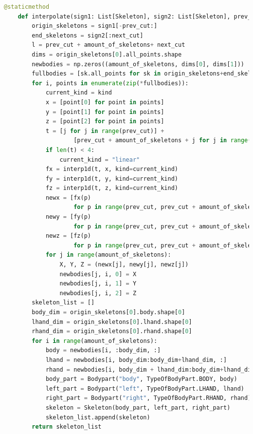\begin{lstlisting}[basicstyle=\tiny,language=Python, caption={Método estático interpolate de la clase TokenLSC}, label={code:tokenlsc:interpolate}] 
 @staticmethod
    def interpolate(sign1: List[Skeleton], sign2: List[Skeleton], prev_cut=2, next_cut=2, amount_of_skeletons=4, kind='cubic'):
        origin_skeletons = sign1[-prev_cut:]
        end_skeletons = sign2[:next_cut]
        l = prev_cut + amount_of_skeletons+ next_cut 
        dims = origin_skeletons[0].all_points.shape
        newbodies = np.zeros((amount_of_skeletons, dims[0], dims[1]))
        fullbodies = [sk.all_points for sk in origin_skeletons+end_skeletons]
        for i, points in enumerate(zip(*fullbodies)):
            current_kind = kind
            x = [point[0] for point in points]
            y = [point[1] for point in points]
            z = [point[2] for point in points]
            t = [j for j in range(prev_cut)] + 
            		[prev_cut + amount_of_skeletons + j for j in range(next_cut)]
            if len(t) < 4:
                current_kind = "linear"
            fx = interp1d(t, x, kind=current_kind)
            fy = interp1d(t, y, kind=current_kind)
            fz = interp1d(t, z, kind=current_kind)
            newx = [fx(p)
                    for p in range(prev_cut, prev_cut + amount_of_skeletons)]
            newy = [fy(p)
                    for p in range(prev_cut, prev_cut + amount_of_skeletons)]
            newz = [fz(p)
                    for p in range(prev_cut, prev_cut + amount_of_skeletons)]
            for j in range(amount_of_skeletons):
                X, Y, Z = (newx[j], newy[j], newz[j])
                newbodies[j, i, 0] = X
                newbodies[j, i, 1] = Y
                newbodies[j, i, 2] = Z
        skeleton_list = []
        body_dim = origin_skeletons[0].body.shape[0]
        lhand_dim = origin_skeletons[0].lhand.shape[0]
        rhand_dim = origin_skeletons[0].rhand.shape[0]
        for i in range(amount_of_skeletons):
            body = newbodies[i, :body_dim, :]
            lhand = newbodies[i, body_dim:body_dim+lhand_dim, :]
            rhand = newbodies[i, body_dim + lhand_dim:body_dim+lhand_dim+rhand_dim, :]
            body_part = Bodypart("body", TypeOfBodyPart.BODY, body)
            left_part = Bodypart("left", TypeOfBodyPart.LHAND, lhand)
            right_part = Bodypart("right", TypeOfBodyPart.RHAND, rhand)
            skeleton = Skeleton(body_part, left_part, right_part)
            skeleton_list.append(skeleton)
        return skeleton_list
\end{lstlisting}

